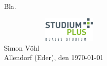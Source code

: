 \begin{preface}
    Bla.

    \vspace{4em}
    \noindent \includegraphics[width=70mm, height=12mm, keepaspectratio]{functional-pages/figures/simon-signature-black.pdf}\\
    \noindent Simon Vöhl\\
    Allendorf (Eder), den \today
\end{preface}

%
%
%
